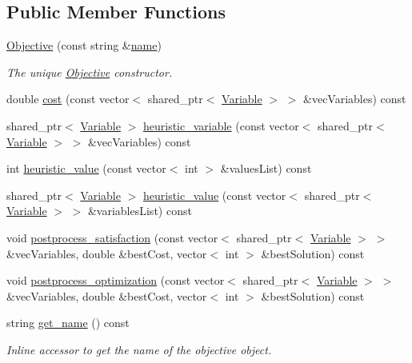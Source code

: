 \subsection*{Public Member Functions}
\begin{DoxyCompactItemize}
\item 
\hyperlink{classghost_1_1Objective_a30a595b146555401e98f51b5a1ef5bfb}{Objective} (const string \&\hyperlink{classghost_1_1Objective_af5bf0605c193884ad7f53593dabe8b85}{name})
\begin{DoxyCompactList}\small\item\em The unique \hyperlink{classghost_1_1Objective}{Objective} constructor. \end{DoxyCompactList}\item 
double \hyperlink{classghost_1_1Objective_a85e094386db13d43e6d18275c4a14ea6}{cost} (const vector$<$ shared\-\_\-ptr$<$ \hyperlink{classghost_1_1Variable}{Variable} $>$ $>$ \&vec\-Variables) const 
\item 
shared\-\_\-ptr$<$ \hyperlink{classghost_1_1Variable}{Variable} $>$ \hyperlink{classghost_1_1Objective_a63b2a60b9336baf47024a12410a62152}{heuristic\-\_\-variable} (const vector$<$ shared\-\_\-ptr$<$ \hyperlink{classghost_1_1Variable}{Variable} $>$ $>$ \&vec\-Variables) const 
\item 
int \hyperlink{classghost_1_1Objective_a5a93f6dcbc41cd8c5d670b695b6d5f3c}{heuristic\-\_\-value} (const vector$<$ int $>$ \&values\-List) const 
\item 
shared\-\_\-ptr$<$ \hyperlink{classghost_1_1Variable}{Variable} $>$ \hyperlink{classghost_1_1Objective_a075fc17c8a6c091dc0638277ca8f2bfc}{heuristic\-\_\-value} (const vector$<$ shared\-\_\-ptr$<$ \hyperlink{classghost_1_1Variable}{Variable} $>$ $>$ \&variables\-List) const 
\item 
void \hyperlink{classghost_1_1Objective_aca285294c2406eb384730f9c627f5323}{postprocess\-\_\-satisfaction} (const vector$<$ shared\-\_\-ptr$<$ \hyperlink{classghost_1_1Variable}{Variable} $>$ $>$ \&vec\-Variables, double \&best\-Cost, vector$<$ int $>$ \&best\-Solution) const 
\item 
void \hyperlink{classghost_1_1Objective_a9e423bb9309762e8641037f53f1f9266}{postprocess\-\_\-optimization} (const vector$<$ shared\-\_\-ptr$<$ \hyperlink{classghost_1_1Variable}{Variable} $>$ $>$ \&vec\-Variables, double \&best\-Cost, vector$<$ int $>$ \&best\-Solution) const 
\item 
string \hyperlink{classghost_1_1Objective_a27e8ef04bf5cfc74d931742a578b282e}{get\-\_\-name} () const 
\begin{DoxyCompactList}\small\item\em Inline accessor to get the name of the objective object. \end{DoxyCompactList}\end{DoxyCompactItemize}
